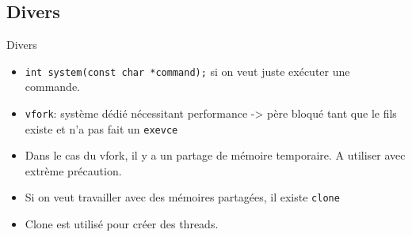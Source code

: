 \section{\sectitle}
\begin{frame}{\sectitle}
\def\subsectitle{Divers}
\subsection{\subsectitle}
\begin{block}{\subsectitle}
\begin{itemize}
    \item \texttt{int system(const char *command);} si on veut juste exécuter
    une commande.
    \item \texttt{vfork}: système dédié nécessitant performance -> père bloqué
    tant que le fils existe et n'a pas fait un \texttt{exevce}
    \item Dans le cas du vfork, il y a un partage de mémoire temporaire. A
    utiliser avec extrème précaution.
    \item Si on veut travailler avec des mémoires partagées, il existe
    \texttt{clone}
    \item Clone est utilisé pour créer des threads.
\end{itemize}
\end{block}
\end{frame}



